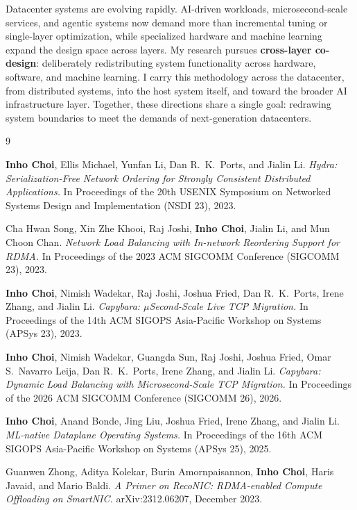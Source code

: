 \documentclass[11pt,letterpaper]{article}
\newcommand{\yr}[1]{\raisebox{0.4ex}{\fontsize{8pt}{8pt}\selectfont\textquotesingle}#1}
\newcommand{\keyterm}[1]{\textbf{\color{darkgray}#1}}
\begin{document}
Datacenter systems are evolving rapidly. AI-driven workloads, microsecond-scale services, and agentic systems now demand more than incremental tuning or single-layer optimization, while specialized hardware and machine learning expand the design space across layers. My research pursues \keyterm{cross-layer co-design}: deliberately redistributing system functionality across hardware, software, and machine learning. I carry this methodology across the datacenter, from distributed systems, into the host system itself, and toward the broader AI infrastructure layer. Together, these directions share a single goal: redrawing system boundaries to meet the demands of next-generation datacenters.
\begin{thebibliography}{9}

\textbf{Inho Choi}, Ellis Michael, Yunfan Li, Dan R.~K.~Ports, and Jialin Li.
\emph{Hydra: Serialization-Free Network Ordering for Strongly Consistent Distributed Applications.}
In Proceedings of the 20th USENIX Symposium on Networked Systems Design and Implementation (NSDI \yr{23}), 2023.

Cha Hwan Song, Xin Zhe Khooi, Raj Joshi, \textbf{Inho Choi}, Jialin Li, and Mun Choon Chan.
\emph{Network Load Balancing with In-network Reordering Support for RDMA.}
In Proceedings of the 2023 ACM SIGCOMM Conference (SIGCOMM \yr{23}), 2023.

\textbf{Inho Choi}, Nimish Wadekar, Raj Joshi, Joshua Fried, Dan R.~K.~Ports, Irene Zhang, and Jialin Li.
\emph{Capybara: $\mu$Second-Scale Live TCP Migration.}
In Proceedings of the 14th ACM SIGOPS Asia-Pacific Workshop on Systems (APSys \yr{23}), 2023.

\textbf{Inho Choi}, Nimish Wadekar, Guangda Sun, Raj Joshi, Joshua Fried, Omar S.~Navarro Leija, Dan R.~K.~Ports, Irene Zhang, and Jialin Li.
\emph{Capybara: Dynamic Load Balancing with Microsecond-Scale TCP Migration.}
In Proceedings of the 2026 ACM SIGCOMM Conference (SIGCOMM \yr{26}), 2026.

\textbf{Inho Choi}, Anand Bonde, Jing Liu, Joshua Fried, Irene Zhang, and Jialin Li.
\emph{ML-native Dataplane Operating Systems.}
In Proceedings of the 16th ACM SIGOPS Asia-Pacific Workshop on Systems (APSys \yr{25}), 2025.

Guanwen Zhong, Aditya Kolekar, Burin Amornpaisannon, \textbf{Inho Choi}, Haris Javaid, and Mario Baldi.
\emph{A Primer on RecoNIC: RDMA-enabled Compute Offloading on SmartNIC.}
arXiv:2312.06207, December 2023.

\end{thebibliography}
\end{document}
